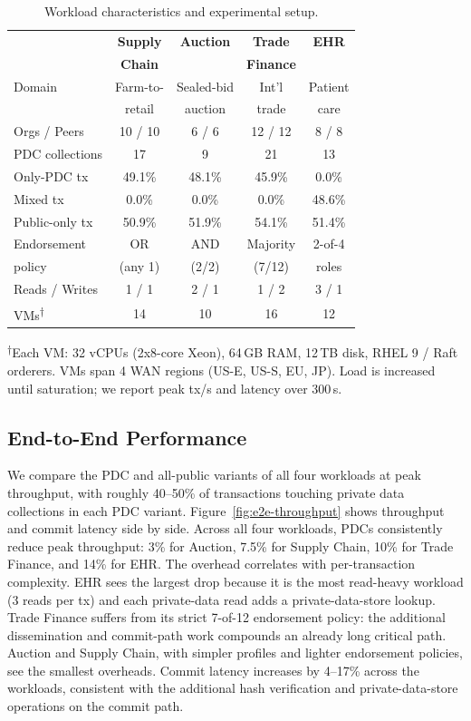 \begin{table}[t]
\centering
\small
\caption{Workload characteristics and experimental setup.}
  \vspace{-0.2cm}
\label{table:workloads}
\setlength{\tabcolsep}{0pt}
\renewcommand{\arraystretch}{0.85}
\begin{tabular*}{\columnwidth}{@{\extracolsep{\fill}} lcccc}
\toprule
 & \textbf{Supply} & \textbf{Auction} & \textbf{Trade} & \textbf{EHR} \\
 & \textbf{Chain} & & \textbf{Finance} & \\
\midrule
Domain & Farm-to- & Sealed-bid & Int'l & Patient \\
 & retail & auction & trade & care \\
Orgs / Peers & 10 / 10 & 6 / 6 & 12 / 12 & 8 / 8 \\
PDC collections & 17 & 9 & 21 & 13 \\
\midrule
Only-PDC tx & 49.1\% & 48.1\% & 45.9\% & 0.0\% \\
Mixed tx & 0.0\% & 0.0\% & 0.0\% & 48.6\% \\
Public-only tx & 50.9\% & 51.9\% & 54.1\% & 51.4\% \\
\midrule
Endorsement & OR & AND & Majority & 2-of-4 \\
policy & (any 1) & (2/2) & (7/12) & roles \\
Reads / Writes & 1 / 1 & 2 / 1 & 1 / 2 & 3 / 1 \\
\midrule
VMs\textsuperscript{$\dagger$} & 14 & 10 & 16 & 12 \\
\bottomrule
\end{tabular*}
{\scriptsize \textsuperscript{$\dagger$}Each VM: 32 vCPUs (2x8-core Xeon), 64\,GB RAM, 12\,TB disk, RHEL 9 /  Raft orderers. VMs span 4 WAN regions (US-E, US-S, EU, JP). Load is increased until saturation; we report peak tx/s and latency over 300\,s.}
\end{table}

\subsection{End-to-End Performance}
We compare the PDC and all-public variants of all four workloads at peak throughput, with roughly 40--50\% of transactions touching private data collections in each PDC variant. Figure~\ref{fig:e2e-throughput} shows throughput and commit latency side by side.
Across all four workloads, PDCs consistently reduce peak throughput: 3\% for Auction, 7.5\% for Supply Chain, 10\% for Trade Finance, and 14\% for EHR. The overhead correlates with per-transaction complexity.
EHR sees the largest drop because it is the most read-heavy workload (3 reads per tx) and each private-data read adds a private-data-store lookup. Trade Finance suffers from its strict 7-of-12 endorsement policy: the additional dissemination and commit-path work compounds an already long critical path. Auction and Supply Chain, with simpler profiles and lighter endorsement policies, see the smallest overheads.
Commit latency increases by 4--17\% across the workloads, consistent with the additional hash verification and private-data-store operations on the commit path.

